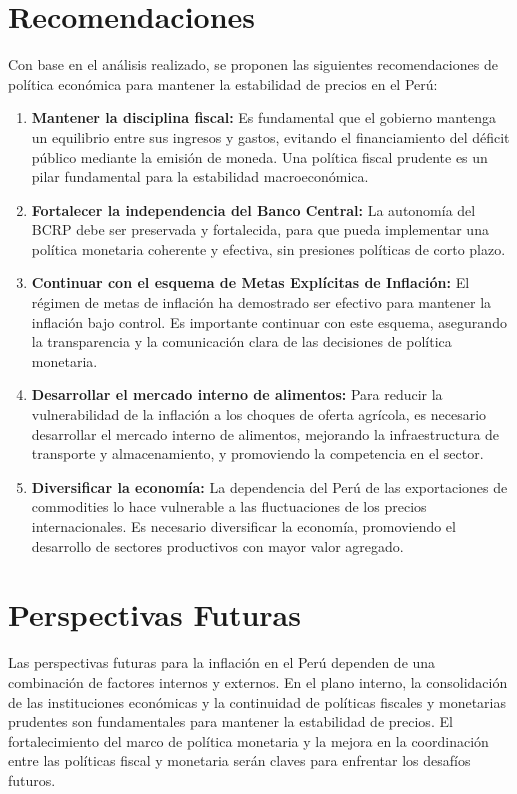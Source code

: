 \documentclass[
  stu,
  floatsintext,
  longtable,
  a4paper,
  nolmodern,
  notxfonts,
  notimes,
  12pt,
  colorlinks=true,linkcolor=blue,citecolor=blue,urlcolor=blue]{apa7}
\providecommand{\tightlist}{%
  \setlength{\itemsep}{0pt}\setlength{\parskip}{0pt}}
\begin{document}
\section{Recomendaciones}\label{recomendaciones}

Con base en el análisis realizado, se proponen las siguientes
recomendaciones de política económica para mantener la estabilidad de
precios en el Perú:

\begin{enumerate}
\def\labelenumi{\arabic{enumi}.}
\tightlist
\item
  \textbf{Mantener la disciplina fiscal:} Es fundamental que el gobierno
  mantenga un equilibrio entre sus ingresos y gastos, evitando el
  financiamiento del déficit público mediante la emisión de moneda. Una
  política fiscal prudente es un pilar fundamental para la estabilidad
  macroeconómica.
\item
  \textbf{Fortalecer la independencia del Banco Central:} La autonomía
  del BCRP debe ser preservada y fortalecida, para que pueda implementar
  una política monetaria coherente y efectiva, sin presiones políticas
  de corto plazo.
\item
  \textbf{Continuar con el esquema de Metas Explícitas de Inflación:} El
  régimen de metas de inflación ha demostrado ser efectivo para mantener
  la inflación bajo control. Es importante continuar con este esquema,
  asegurando la transparencia y la comunicación clara de las decisiones
  de política monetaria.
\item
  \textbf{Desarrollar el mercado interno de alimentos:} Para reducir la
  vulnerabilidad de la inflación a los choques de oferta agrícola, es
  necesario desarrollar el mercado interno de alimentos, mejorando la
  infraestructura de transporte y almacenamiento, y promoviendo la
  competencia en el sector.
\item
  \textbf{Diversificar la economía:} La dependencia del Perú de las
  exportaciones de commodities lo hace vulnerable a las fluctuaciones de
  los precios internacionales. Es necesario diversificar la economía,
  promoviendo el desarrollo de sectores productivos con mayor valor
  agregado.
\end{enumerate}

\section{Perspectivas Futuras}\label{perspectivas-futuras}

Las perspectivas futuras para la inflación en el Perú dependen de una
combinación de factores internos y externos. En el plano interno, la
consolidación de las instituciones económicas y la continuidad de
políticas fiscales y monetarias prudentes son fundamentales para
mantener la estabilidad de precios. El fortalecimiento del marco de
política monetaria y la mejora en la coordinación entre las políticas
fiscal y monetaria serán claves para enfrentar los desafíos futuros.
\end{document}
